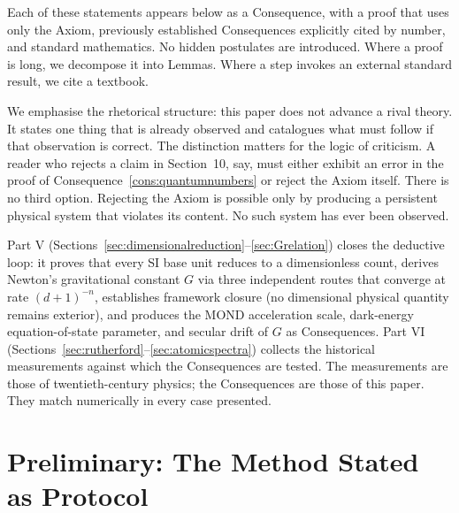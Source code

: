 Each of these statements appears below as a Consequence, with a proof that uses only the Axiom, previously established Consequences explicitly cited by number, and standard mathematics. No hidden postulates are introduced. Where a proof is long, we decompose it into Lemmas. Where a step invokes an external standard result, we cite a textbook.

We emphasise the rhetorical structure: this paper does not advance a rival theory. It states one thing that is already observed and catalogues what must follow if that observation is correct. The distinction matters for the logic of criticism. A reader who rejects a claim in Section~10, say, must either exhibit an error in the proof of Consequence~\ref{cons:quantumnumbers} or reject the Axiom itself. There is no third option. Rejecting the Axiom is possible only by producing a persistent physical system that violates its content. No such system has ever been observed.

Part V (Sections~\ref{sec:dimensionalreduction}--\ref{sec:Grelation}) closes the deductive loop: it proves that every SI base unit reduces to a dimensionless count, derives Newton's gravitational constant $G$ via three independent routes that converge at rate $(d+1)^{-n}$, establishes framework closure (no dimensional physical quantity remains exterior), and produces the MOND acceleration scale, dark-energy equation-of-state parameter, and secular drift of $G$ as Consequences. Part VI (Sections~\ref{sec:rutherford}--\ref{sec:atomicspectra}) collects the historical measurements against which the Consequences are tested. The measurements are those of twentieth-century physics; the Consequences are those of this paper. They match numerically in every case presented.

\section{Preliminary: The Method Stated as Protocol}
\label{sec:protocol}

